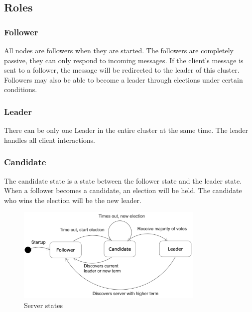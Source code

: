 \documentclass[12pt, a4paper]{article}
\begin{document}
\subsection{Roles}
  \subsubsection{Follower}
  All nodes are followers when they are started. The followers are completely passive, they can only respond to incoming
  messages. If the client's message is sent to a follower, the message will be redirected to the leader of this cluster. Followers may
  also be able to become a leader through elections under certain conditions.
  \subsubsection{Leader}
  There can be only one Leader in the entire cluster at the same time. The leader handles all client interactions.
  \subsubsection{Candidate}
  The candidate state is a state between the follower state and the leader state. When a follower becomes a candidate, an election
  will be held. The candidate who wins the election will be the new leader.
  \begin{figure}[htp]
      \centering
      \includegraphics[width=0.8\textwidth]{img/raft-state-diagram.png}
      \caption{Server states}
      \label{fig:raft-states}
  \end{figure}
\end{document}
